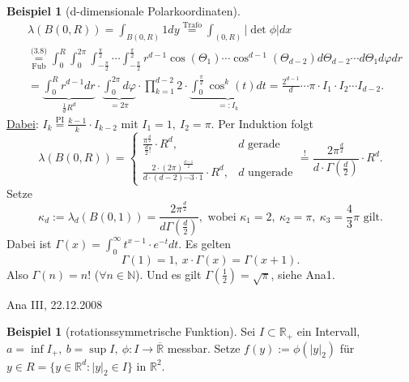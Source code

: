 \documentclass[a4paper]{scrreprt}
\newcommand{\R}{\mathbb{R}}
\newcommand{\Rq}{\overline{\R}}
\newcommand{\N}{\mathbb{N}}
\newcommand{\jlabel}[1]{\label{j_#1}}
\newcommand{\jshortlink}[1]{\jhyperref{#1}{\text{#1}}}
\newcommand{\jhyperref}[2]{\hyperref[j_#1]{#2}}
\newcommand{\jabb}[3]{ #1: #2 \rightarrow #3 }
\newcommand{\jshortlinkFubini}{\jhyperref{Fubini}{\text{Fub}}}
\newcommand{\jspacesmall}{\vspace{4pt}}
\newcommand{\jdate}[1]{\jspacesmall\begin{center}\jlabel{#1}\tiny{Ana III, #1}\end{center}}
\theoremstyle{plain}
\theoremstyle{definition}
\newtheorem{expl}[thm]{Beispiel}
\begin{document}
{{{{\begin{expl}[d-dimensionale Polarkoordinaten]
    \[
        \begin{split}
            &\lambda(B(0,R)) = \int_{B(0,R)} 1 dy \overset{\jshortlink{Trafo}}{=} \int_{(0,R)} |\det \phi| dx\\
            &\underset{\jshortlinkFubini}{\overset{\jshortlink{(3.8)}}{=}} \int_0^R\int_0^{2\pi}\int_{-\frac{\pi}{2}}^{\frac{\pi}{2}} \cdots \int_{-\frac{\pi}{2}}^{\frac{\pi}{2}} r^{d-1} \cos(\Theta_1) \cdots \cos^{d-1}(\Theta_{d-2})d\Theta_{d-2}\cdots d\Theta_1 d\varphi dr\\
            &= \underbrace{\int_0^R r^{d-1}dr}_{\frac{1}{d} R^d}\cdot \underbrace{\int_0^{2\pi} d\varphi}_{= 2\pi} \cdot \prod_{k=1}^{d-2}2\cdot \underbrace{\int_0^{\frac{\pi}{2}} \cos^k(t)dt}_{=:I_k} = \frac{2^{d-1}}{d} \cdots \pi \cdot I_1\cdot I_2\cdots I_{d-2}.
        \end{split}
    \]
    \uline{Dabei}: $I_k \overset{\text{PI}}{=} \frac{k-1}{k} \cdot I_{k-2}$ mit $I_1 = 1,\ I_2 = \pi$. Per Induktion folgt
    \[
        \lambda(B(0,R)) = \begin{cases}
                              \frac{\pi^{\frac{d}{2}}}{\frac{d}{2}!}\cdot R^d, &d \text{ gerade}\\
                              \frac{2\cdot(2\pi)^{\frac{d-1}{2}}}{d\cdot(d-2)\cdots 3 \cdot 1}\cdot R^d, &d \text{ ungerade}
                          \end{cases}
                        \overset{!}{=} \frac{2\pi^{\frac{d}{2}}}{d\cdot\Gamma(\frac{d}{2})}\cdot R^d.
    \]
    Setze
    \begin{equation}
        \jlabel{(3.9)}
        \kappa_d := \lambda_d(B(0,1)) = \frac{2\pi^{\frac{d}{2}}}{d\Gamma(\frac{d}{2})}, \text{ wobei } \kappa_1 = 2, \ \kappa_2 = \pi, \ \kappa_3 = \frac{4}{3}\pi \text{ gilt}.
    \end{equation}
    Dabei ist $\Gamma(x) = \int_0^\infty t^{x-1}\cdot e^{-t}dt$. Es gelten
    \begin{equation}
        \jlabel{(3.10)}
        \Gamma(1)=1, \ x\cdot \Gamma(x) = \Gamma(x+1).
    \end{equation}
    Also $\Gamma(n) = n!$ ($\forall n\in\N$). Und es gilt $\Gamma(\frac{1}{2}) = \sqrt{\pi}$, siehe Ana1.
\end{expl}

\jdate{22.12.2008}

\begin{expl}[rotationssymmetrische Funktion]
    \jlabel{Bsp 3.36}
    Sei $I\subset \R_+$ ein Intervall, $a=\inf I_+,\ b = \sup I, \ \jabb{\phi}{I}{\Rq}$ messbar. Setze $f(y):= \phi(|y|_2)$ für $y \in R = \{y\in\R^d : |y|_2 \in I\}$ in $\R^2$.
    

\end{expl}}}}}
\end{document}
